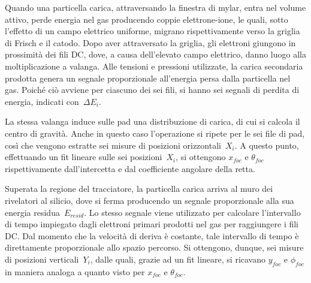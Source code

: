 Quando una particella carica, attraversando la finestra di mylar, entra nel volume attivo, perde energia nel gas producendo coppie elettrone-ione, le quali, sotto l'effetto di un campo elettrico uniforme, migrano rispettivamente verso la griglia di Frisch e il catodo. 
Dopo aver attraversato la griglia, gli elettroni giungono in prossimità dei fili DC, dove, a causa dell'elevato campo elettrico, danno luogo alla moltiplicazione a valanga. 
Alle tensioni e pressioni utilizzate, la carica secondaria prodotta genera un segnale proporzionale all'energia persa dalla particella nel gas. 
Poiché ciò avviene per ciascuno dei sei fili, si hanno sei segnali di perdita di energia, indicati con~$\Delta E_i$.





La stessa valanga induce sulle pad una distribuzione di carica, di cui si calcola il centro di gravità. Anche in questo caso l'operazione si ripete per le sei file di pad, così che vengono estratte sei misure di posizioni orizzontali~$X_i$.
A questo punto, effettuando un fit lineare sulle sei posizioni~$X_i$, si ottengono $x_{foc}$ e $\theta_{foc}$ rispettivamente dall'intercetta e dal coefficiente angolare della retta.

Superata la regione del tracciatore, la particella carica arriva al muro dei rivelatori al silicio, dove si ferma producendo un segnale proporzionale alla sua energia residua~$E_{resid}$. 
Lo stesso segnale viene utilizzato per calcolare l'intervallo di tempo impiegato dagli elettroni primari prodotti nel gas per raggiungere i fili DC. 
Dal momento che la velocità di deriva è costante, tale intervallo di tempo è direttamente proporzionale allo spazio percorso. Si ottengono, dunque, sei misure di posizioni verticali~$Y_i$, dalle quali, grazie ad un fit lineare, si ricavano $y_{foc}$ e $\phi_{foc}$ in maniera analoga a quanto visto per $x_{foc}$ e $\theta_{foc}$.

